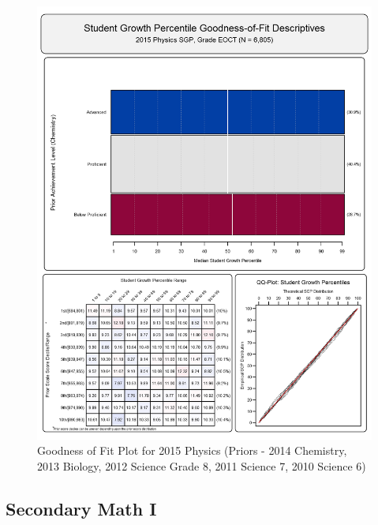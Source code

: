\documentclass[12pt]{article}
\begin{document}
\begin{figure}[htbp]
\centering
\includegraphics{../img/Goodness_of_Fit/PHYSICS.2015/2015_PHYSICS_EOCT;2014_CHEMISTRY_EOCT;2013_BIOLOGY_EOCT;2012_SCIENCE_8;2011_SCIENCE_7;2010_SCIENCE_6.png}
\caption{Goodness of Fit Plot for 2015 Physics (Priors - 2014 Chemistry,
2013 Biology, 2012 Science Grade 8, 2011 Science 7, 2010 Science 6)}
\end{figure}

\clearpage 

\subsection{Secondary Math I}\label{secondary-math-i}
\end{document}

